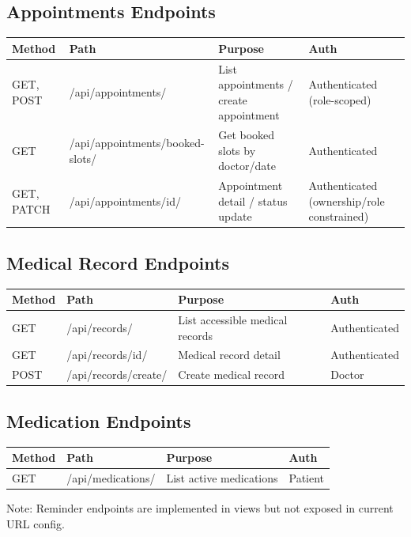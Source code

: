 \documentclass[12pt,a4paper]{article}
\begin{document}
\subsection{Appointments Endpoints}

\begin{longtable}{p{2cm} p{4.4cm} p{4.8cm} p{2.4cm}}
\toprule
\textbf{Method} & \textbf{Path} & \textbf{Purpose} & \textbf{Auth} \\
\midrule
GET, POST & /api/appointments/ & List appointments / create appointment & Authenticated (role-scoped) \\
GET & /api/appointments/booked-slots/ & Get booked slots by doctor/date & Authenticated \\
GET, PATCH & /api/appointments/{id}/ & Appointment detail / status update & Authenticated (ownership/role constrained) \\
\bottomrule
\end{longtable}

\subsection{Medical Record Endpoints}

\begin{longtable}{p{2cm} p{4.4cm} p{4.8cm} p{2.4cm}}
\toprule
\textbf{Method} & \textbf{Path} & \textbf{Purpose} & \textbf{Auth} \\
\midrule
GET & /api/records/ & List accessible medical records & Authenticated \\
GET & /api/records/{id}/ & Medical record detail & Authenticated \\
POST & /api/records/create/ & Create medical record & Doctor \\
\bottomrule
\end{longtable}

\subsection{Medication Endpoints}

\begin{longtable}{p{2cm} p{4.4cm} p{4.8cm} p{2.4cm}}
\toprule
\textbf{Method} & \textbf{Path} & \textbf{Purpose} & \textbf{Auth} \\
\midrule
GET & /api/medications/ & List active medications & Patient \\
\bottomrule
\end{longtable}

Note: Reminder endpoints are implemented in views but not exposed in current URL config.
\end{document}
